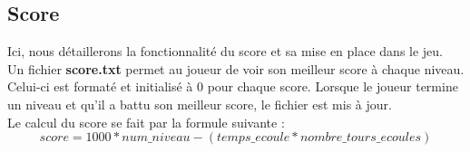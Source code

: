 \documentclass{article}
\begin{document}
\subsection{Score}
Ici, nous détaillerons la fonctionnalité du score et sa mise en place dans le jeu.\\ 
Un fichier \textbf{score.txt} permet au joueur de voir son meilleur score à chaque niveau. Celui-ci est formaté et initialisé à 0 pour chaque score. Lorsque le joueur termine un niveau et qu'il a battu son meilleur score, le fichier est mis à jour.\\
Le calcul du score se fait par la formule suivante :
\begin{equation}
    score = 1000*num\_niveau - (temps\_ecoule*nombre\_tours\_ecoules)
\end{equation}




\listoffigures
\end{document}
